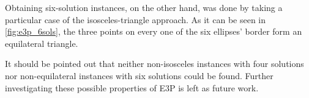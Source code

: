 Obtaining six-solution instances, on the other hand, was done by taking a particular case of the isosceles-triangle approach.
As it can be seen in \autoref{fig:e3p_6sols}, the three points on every one of the six ellipses' border form an equilateral triangle.

It should be pointed out that neither non-isosceles instances with four solutions nor non-equilateral instances with six solutions could be found. Further investigating these possible properties of E3P is left as future work.
